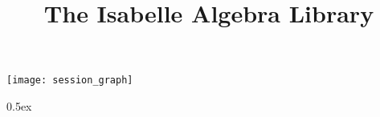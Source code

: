 \documentclass[11pt,a4paper]{article}
\begin{document}
\title{The Isabelle Algebra Library}
\maketitle

\tableofcontents

\begin{center}
  \texttt{[image: session\_graph]}
\end{center}

\clearpage

\parindent 0pt\parskip 0.5ex



%
%
\end{document}
